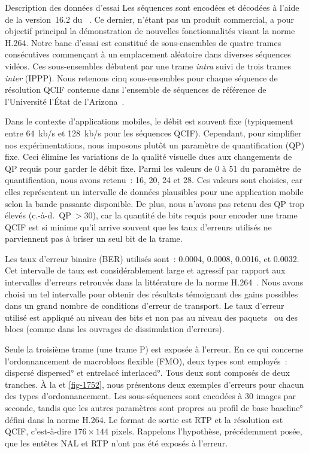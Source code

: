\begin{section}{Description des données d'essai}
Les séquences sont encodées et décodées à l'aide de la version~16.2 du
\ltCodec~\citep{JM}. Ce dernier, n'étant pas un produit commercial, a pour
objectif principal la démonstration de nouvelles fonctionnalités visant la norme
H.264. Notre banc d'essai est constitué de sous-ensembles de quatre trames
consécutives commençant à un emplacement aléatoire dans diverses séquences
vidéos. Ces sous-ensembles débutent par une trame \textit{intra} suivi de trois
trames \textit{inter} (IPPP). Nous retenons cinq sous-ensembles pour chaque
séquence de résolution QCIF contenue dans l'ensemble de séquences de référence
de l'Université l'État de l'Arizona~\citep{YUV}.

Dans le contexte d'applications mobiles, le débit est souvent fixe (typiquement
entre 64~kb/s et 128~kb/s pour les séquences QCIF). Cependant, pour simplifier
nos expérimentations, nous imposons plutôt un paramètre de quantification (QP)
fixe. Ceci élimine les variations de la qualité visuelle dues aux changements de
QP requis pour garder le débit fixe. Parmi les valeurs de 0 à 51 du paramètre de
quantification, nous avons retenu~: 16, 20, 24 et 28. Ces valeurs sont choisies,
car elles représentent un intervalle de données plausibles pour une application
mobile selon la bande passante disponible. De plus, nous n'avons pas retenu des
QP trop élevés (c.-à-d.~QP$~>30$), car la quantité de bits requis pour encoder
une trame QCIF est si minime qu’il arrive souvent que les taux d’erreurs
utilisés ne parviennent pas à briser un seul bit de la trame.

Les taux d'erreur binaire (BER) utilisés sont~: 0.0004, 0.0008, 0.0016, et
0.0032. Cet intervalle de taux est considérablement large et agressif par
rapport aux intervalles d'erreurs retrouvés dans la littérature de la norme
H.264~\citep{Stockhammer2003}. Nous avons choisi un tel intervalle pour obtenir
des résultats témoignant des gains possibles dans un grand nombre de conditions
d'erreur de transport. Le taux d'erreur utilisé est appliqué au niveau des bits
et non pas au niveau des paquets~\citep{Wenger2003} ou des blocs (comme dans les
ouvrages de dissimulation d'erreurs).

Seule la troisième trame (une trame P) est exposée à l'erreur. En ce qui
concerne l'ordonnancement de macroblocs flexible (FMO), deux types sont
employés~: dispersé \ang{dispersed} et entrelacé \ang{interlaced}. Tous deux
sont composés de deux tranches. À la  et \ref{fig-1752}, nous
présentons deux exemples d'erreurs pour chacun des types d'ordonnancement. Les
sous-séquences sont encodées à 30 images par seconde, tandis que les autres
paramètres sont propres au profil de base \ang{baseline} défini dans la norme
H.264. Le format de sortie est RTP et la résolution est QCIF, c'est-à-dire
$176\times 144$ pixels. Rappelons l'hypothèse, précédemment posée, que les
entêtes NAL et RTP n'ont pas été exposés à l'erreur.


\end{section}
